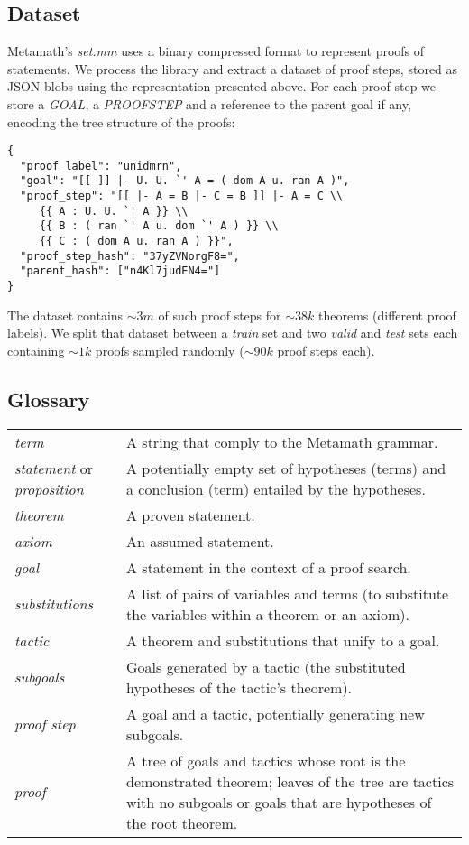 \documentclass{article}
\begin{document}
\subsection{Dataset}

Metamath's \textit{set.mm} uses a binary compressed format to represent proofs of statements. We process the library and extract a dataset of proof steps, stored as JSON blobs using the representation presented above. For each proof step we store a \textit{GOAL}, a \textit{PROOFSTEP} and a reference to the parent goal if any, encoding the tree structure of the proofs:

\begin{verbatim}
{
  "proof_label": "unidmrn",
  "goal": "[[ ]] |- U. U. `' A = ( dom A u. ran A )",
  "proof_step": "[[ |- A = B |- C = B ]] |- A = C \\
     {{ A : U. U. `' A }} \\
     {{ B : ( ran `' A u. dom `' A ) }} \\
     {{ C : ( dom A u. ran A ) }}",
  "proof_step_hash": "37yZVNorgF8=",
  "parent_hash": ["n4Kl7judEN4="]
}
\end{verbatim}

The dataset contains $\sim 3m$ of such proof steps for $\sim 38k$ theorems (different proof labels). We split that dataset between a \textit{train} set and two \textit{valid} and \textit{test} sets each containing $\sim 1k$ proofs sampled randomly ($\sim 90k$ proof steps each).

\subsection{Glossary}

\begin{tabular}{p{3cm} p{10.1cm}} 
  \textit{term} & A string that comply to the Metamath grammar. \\[4pt]
  \textit{statement} or \textit{proposition} & A potentially empty set of hypotheses (terms) and a conclusion (term) entailed by the hypotheses. \\[4pt]
  \textit{theorem} & A proven statement. \\[4pt]
  \textit{axiom} & An assumed statement. \\[4pt]
  \textit{goal} & A statement in the context of a proof search. \\[4pt]
  \textit{substitutions} & A list of pairs of variables and terms (to substitute the variables within a theorem or an axiom). \\[4pt]
  \textit{tactic} & A theorem and substitutions that unify to a goal. \\[4pt]
  \textit{subgoals} & Goals generated by a tactic (the substituted hypotheses of the tactic's theorem). \\[4pt]
  \textit{proof step} & A goal and a tactic, potentially generating new subgoals. \\[4pt]
  \textit{proof} & A tree of goals and tactics whose root is the demonstrated theorem; leaves of the tree are tactics with no subgoals or goals that are hypotheses of the root theorem. \\[4pt]
\end{tabular}
\end{document}
